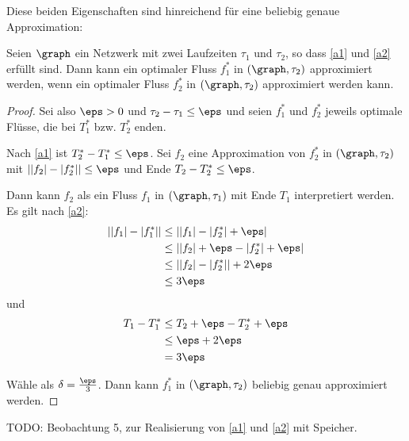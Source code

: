 Diese beiden Eigenschaften sind hinreichend für eine beliebig genaue Approximation:
\begin{corollary}
    Seien $\graph$ ein Netzwerk mit zwei Laufzeiten $\tau_1$ und $\tau_2$, so dass
    \ref{a1} und \ref{a2} erfüllt sind.
    Dann kann ein optimaler Fluss $f_1^*$ in $(\graph, \tau_2)$ approximiert werden,
    wenn ein optimaler Fluss $f_2^*$ in $(\graph, \tau_2)$ approximiert werden kann.

    \begin{proof}    
        Sei also $\eps > 0$ und
        $\tau_2 - \tau_1 \leq \eps$ und seien $f_1^*$ und $f_2^*$ jeweils optimale
        Flüsse, die bei $T_1^*$ bzw. $T_2^*$ enden.
    
        Nach \ref{a1} ist $T_2^* - T_1^*\leq \eps$. Sei $f_2$ eine
        Approximation von $f_2^*$ in $(\graph, \tau_2)$ mit
        $||f_2| - |f_2^*|| \leq \eps$ und Ende $T_2 - T_2^* \leq \eps$.

        Dann kann $f_2$ als ein Fluss $f_1$ in $(\graph, \tau_1)$
        mit Ende $T_1$ interpretiert werden. Es gilt nach \ref{a2}:
        \begin{align*}
            ||f_1| - |f_1^*|| & \leq ||f_1| - |f_2^*| + \eps| \\
                            & \leq ||f_2| + \eps - |f_2^*| + \eps| \\
                            & \leq ||f_2| - |f_2^*|| + 2 \eps \\
                            & \leq 3 \eps
        \end{align*}
        und
        \begin{align*}
            T_1 - T_1^*  & \leq T_2 + \eps - T_2^* + \eps \\
                & \leq \eps + 2\eps \\
                & = 3 \eps
        \end{align*}
        
        Wähle als $\delta = \frac{\eps}{3}$. Dann kann $f_1^*$ in
        $(\graph, \tau_2)$ beliebig genau approximiert werden.
    \end{proof}
\end{corollary}

\begin{observation}
    TODO: Beobachtung 5, zur Realisierung von \ref{a1} und \ref{a2} mit Speicher.
\end{observation}


